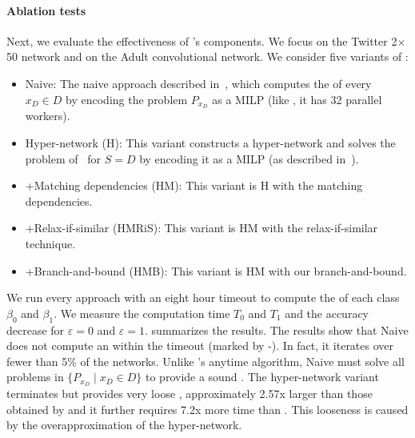 \paragraph{Ablation tests}  
Next, we evaluate the effectiveness of \tool's components. We focus on the Twitter 2$\times$50 network and on the Adult convolutional network. 
We consider five variants of \tool:
\begin{itemize}[nosep,nolistsep] 
\item Naive: The naive approach described in~, which computes the \propa of every $x_D \in D$ by encoding the problem $P_{x_D}$ as a MILP (like \tool, it has 32 parallel workers). %
\item Hyper-network (H): This variant constructs a hyper-network and solves the problem of~ for $S=D$ by encoding it as a MILP (as described in~). %
\item +Matching dependencies (HM): This variant is H with the matching dependencies. %
\item +Relax-if-similar (HMRiS): This variant is HM with the relax-if-similar technique. 
\item +Branch-and-bound (HMB): This variant is HM with our branch-and-bound.

\end{itemize}
We run every approach with an eight hour timeout to compute the \propa of each class
 $\beta_0$ and $\beta_1$. %
We measure the computation time $T_0$ and $T_1$ and the accuracy decrease for $\varepsilon=0$ and $\varepsilon=1$. 
 summarizes the results. 
The results show that Naive does not compute an \propa within the timeout (marked by -). 
In fact, it iterates over fewer than 5\% of the networks. %
Unlike \tool's anytime algorithm, Naive must solve all problems in $\{P_{x_D} \mid x_D \in D \}$ to provide a sound \propa.
The hyper-network variant terminates but provides very loose \propa, approximately 2.57x larger than those obtained by \tool and it further requires 7.2x more time than \tool. 
This looseness is caused by the overapproximation of the hyper-network. 
